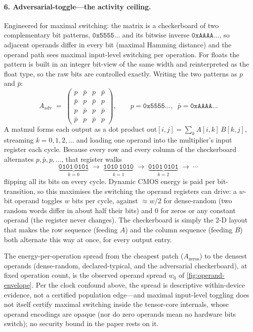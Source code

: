 \documentclass{article}
\theoremstyle{plain}
\theoremstyle{definition}
\theoremstyle{remark}
\begin{document}
\paragraph{6. Adversarial-toggle---the activity ceiling.}
Engineered for maximal switching: the matrix is a checkerboard of two
complementary bit patterns, $\texttt{0x5555}\ldots$ and its bitwise
inverse $\texttt{0xAAAA}\ldots$, so adjacent operands differ in every
bit (maximal Hamming distance) and the operand path sees maximal
input-level switching per operation. For floats the pattern is built in an
integer bit-view of the same width and reinterpreted as the float type, so
the raw bits are controlled exactly. Writing the
two patterns as $p$ and $\bar p$:
\begin{equation*}
	A_{\mathrm{adv}} \;=\;
	\begin{pmatrix}
		p & \bar p & p & \bar p \\
		\bar p & p & \bar p & p \\
		p & \bar p & p & \bar p \\
		\bar p & p & \bar p & p
	\end{pmatrix},
	\qquad
	p = \texttt{0x5555}\ldots,\;\; \bar p = \texttt{0xAAAA}\ldots
\end{equation*}
A matmul forms each output as a dot product
$\text{out}[i,j]=\sum_k A[i,k]\,B[k,j]$, streaming $k=0,1,2,\ldots$ and
loading one operand into the multiplier's input register each cycle.
Because every row and every column of the checkerboard alternates
$p,\bar p,p,\ldots$, that register walks
\begin{equation*}
	\underbrace{\mathtt{0101\,0101}}_{k=0}\;\to\;\underbrace{\mathtt{1010\,1010}}_{k=1}\;\to\;
	\underbrace{\mathtt{0101\,0101}}_{k=2}\;\to\;\cdots
\end{equation*}
flipping all its bits on every cycle. Dynamic CMOS energy is
paid per bit-transition, so this maximises the switching the operand
registers can drive: a $w$-bit operand toggles $w$ bits per cycle, against ${\approx}w/2$
for dense-random (two random words differ in about half their bits) and $0$
for zeros or any constant operand (the register never changes). The
checkerboard is simply the 2-D layout that makes the row sequence (feeding
$A$) and the column sequence (feeding $B$) both alternate this way at once,
for every output entry.

The energy-per-operation spread from the cheapest patch ($A_{\mathrm{zeros}}$)
to the densest operands (dense-random, declared-typical, and the adversarial
checkerboard), at fixed operation count, is the observed operand spread
$w_0$ of \cref{fig:operand-envelope}. Per
the clock confound above, the spread is
descriptive within-device evidence, not a certified population edge---and
maximal input-level toggling does not itself certify maximal switching
inside the tensor-core internals, whose operand encodings are opaque (nor
do zero operands mean no hardware bits switch); no security bound in the
paper rests on it.
\end{document}

